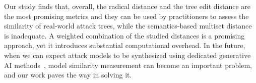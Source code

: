 Our study finds that, overall, the radical distance and the tree edit distance are the most promising metrics and they can be used by practitioners to assess the similarity of real-world attack trees, while the semantics-based multiset distance is inadequate.  A weighted combination of the studied distances is a promising approach, yet it introduces substantial computational overhead. In the future, when we can expect attack models to be synthesized using dedicated generative AI methods~\cite{elshareffacilitating,happe2023getting,xu2024autoattacker,zhang2024attackg,zhang2024vtt}, model similarity measurement can become an important problem, and our work paves the way in solving it. 









